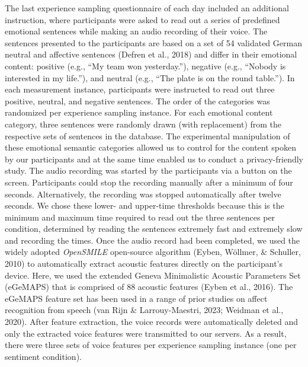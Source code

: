 \documentclass[
  english,
  man,floatsintext]{apa6}
\begin{document}
The last experience sampling questionnaire of each day included an additional instruction, where participants were asked to read out a series of predefined emotional sentences while making an audio recording of their voice. The sentences presented to the participants are based on a set of 54 validated German neutral and affective sentences (Defren et al., 2018) and differ in their emotional content: positive (e.g., ``My team won yesterday.''), negative (e.g., ``Nobody is interested in my life.''), and neutral (e.g., ``The plate is on the round table.''). In each measurement instance, participants were instructed to read out three positive, neutral, and negative sentences. The order of the categories was randomized per experience sampling instance. For each emotional content category, three sentences were randomly drawn (with replacement) from the respective sets of sentences in the database. The experimental manipulation of these emotional semantic categories allowed us to control for the content spoken by our participants and at the same time enabled us to conduct a privacy-friendly study. The audio recording was started by the participants via a button on the screen. Participants could stop the recording manually after a minimum of four seconds. Alternatively, the recording was stopped automatically after twelve seconds. We chose these lower- and upper-time thresholds because this is the minimum and maximum time required to read out the three sentences per condition, determined by reading the sentences extremely fast and extremely slow and recording the times. Once the audio record had been completed, we used the widely adopted \emph{OpenSMILE} open-source algorithm (Eyben, Wöllmer, \& Schuller, 2010) to automatically extract acoustic features directly on the participant's device. Here, we used the extended Geneva Minimalistic Acoustic Parameters Set (eGeMAPS) that is comprised of 88 acoustic features (Eyben et al., 2016). The eGeMAPS feature set has been used in a range of prior studies on affect recognition from speech (van Rijn \& Larrouy-Maestri, 2023; Weidman et al., 2020). After feature extraction, the voice records were automatically deleted and only the extracted voice features were transmitted to our servers. As a result, there were three sets of voice features per experience sampling instance (one per sentiment condition).
\end{document}
